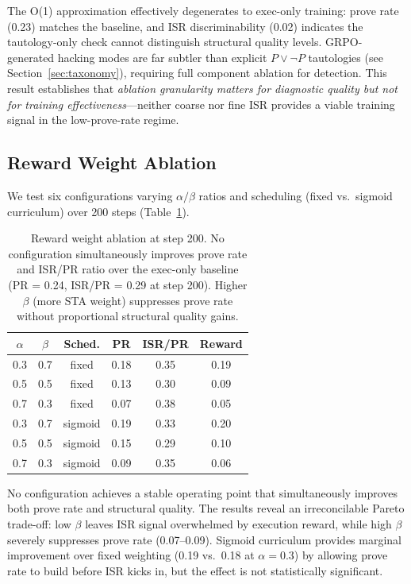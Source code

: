 \documentclass[11pt,a4paper]{article}
\begin{document}
The O(1) approximation effectively degenerates to exec-only training: prove rate (0.23) matches the baseline, and ISR discriminability (0.02) indicates the tautology-only check cannot distinguish structural quality levels.
GRPO-generated hacking modes are far subtler than explicit $P \vee \neg P$ tautologies (see Section~\ref{sec:taxonomy}), requiring full component ablation for detection.
This result establishes that \emph{ablation granularity matters for diagnostic quality but not for training effectiveness}---neither coarse nor fine ISR provides a viable training signal in the low-prove-rate regime.

\subsection{Reward Weight Ablation}
\label{sec:weight-ablation}

We test six configurations varying $\alpha/\beta$ ratios and scheduling (fixed vs.\ sigmoid curriculum) over 200 steps (Table~\ref{tab:weight-ablation}).

\begin{table}[t]
\centering
\small
\begin{tabular}{cccccc}
\toprule
$\alpha$ & $\beta$ & \textbf{Sched.} & \textbf{PR} & \textbf{ISR/PR} & \textbf{Reward} \\
\midrule
0.3 & 0.7 & fixed   & 0.18 & 0.35 & 0.19 \\
0.5 & 0.5 & fixed   & 0.13 & 0.30 & 0.09 \\
0.7 & 0.3 & fixed   & 0.07 & 0.38 & 0.05 \\
0.3 & 0.7 & sigmoid & 0.19 & 0.33 & 0.20 \\
0.5 & 0.5 & sigmoid & 0.15 & 0.29 & 0.10 \\
0.7 & 0.3 & sigmoid & 0.09 & 0.35 & 0.06 \\
\bottomrule
\end{tabular}
\caption{Reward weight ablation at step 200. No configuration simultaneously improves prove rate and ISR/PR ratio over the exec-only baseline (PR = 0.24, ISR/PR = 0.29 at step 200). Higher $\beta$ (more STA weight) suppresses prove rate without proportional structural quality gains.}
\label{tab:weight-ablation}
\end{table}

No configuration achieves a stable operating point that simultaneously improves both prove rate and structural quality.
The results reveal an irreconcilable Pareto trade-off: low $\beta$ leaves ISR signal overwhelmed by execution reward, while high $\beta$ severely suppresses prove rate (0.07--0.09).
Sigmoid curriculum provides marginal improvement over fixed weighting (0.19 vs.\ 0.18 at $\alpha = 0.3$) by allowing prove rate to build before ISR kicks in, but the effect is not statistically significant.
\end{document}
